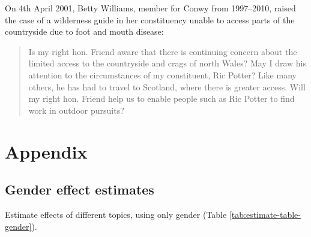 \documentclass[]{article}
\theoremstyle{definition}
\theoremstyle{definition}
\theoremstyle{definition}
\theoremstyle{remark}
\begin{document}
On 4th April 2001, Betty Williams, member for Conwy from 1997--2010,
raised the case of a wilderness guide in her constituency unable to
access parts of the countryside due to foot and mouth disease:

\begin{quote}
Is my right hon. Friend aware that there is continuing concern about the
limited access to the countryside and crags of north Wales? May I draw
his attention to the circumstances of my constituent, Ric Potter? Like
many others, he has had to travel to Scotland, where there is greater
access. Will my right hon. Friend help us to enable people such as Ric
Potter to find work in outdoor pursuits?
\end{quote}

\clearpage

\hypertarget{appendix}{%
\section{Appendix}\label{appendix}}

\hypertarget{gender-effect-estimates}{%
\subsection{Gender effect estimates}\label{gender-effect-estimates}}

Estimate effects of different topics, using only gender (Table
\ref{tab:estimate-table-gender}).
\end{document}

